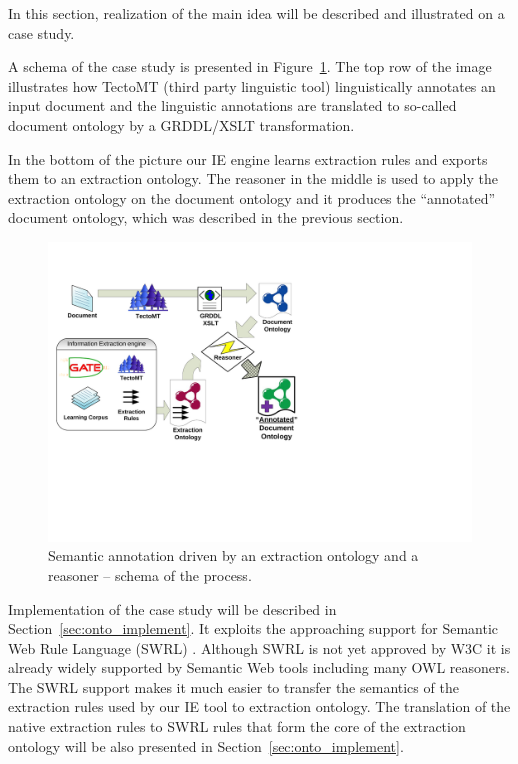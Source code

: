 In this section, realization of the main idea will be described and illustrated on a case study.

A schema of the case study is presented in Figure~\ref{fig:rules_app_schema}.  
The top row of the image illustrates how TectoMT (third party linguistic tool) linguistically annotates an input document and the linguistic annotations are translated to so-called document ontology by a GRDDL/XSLT transformation.

In the bottom of the picture our IE engine learns extraction rules and exports them to an extraction ontology. The reasoner in the middle is used to apply the extraction ontology on the document ontology and it produces the ``annotated'' document ontology, which was described in the previous section.


\begin{figure}
\centerline{\includegraphics[angle=-90, width=0.8\hsize]{semantic_rules_app_schema}}
\caption{Semantic annotation driven by an extraction ontology and a reasoner -- schema of the process.}
\label{fig:rules_app_schema}
\end{figure}

Implementation of the case study will be described in Section~\ref{sec:onto_implement}. It exploits the approaching support for Semantic Web Rule Language (SWRL) \citep{SWRL}. Although SWRL is not yet approved by W3C it is already widely supported by Semantic Web tools including many OWL reasoners. The SWRL support makes it much easier to transfer the semantics of the extraction rules used by our IE tool to extraction ontology. The translation of the native extraction rules to SWRL rules that form the core of the extraction ontology will be also presented in Section~\ref{sec:onto_implement}.







